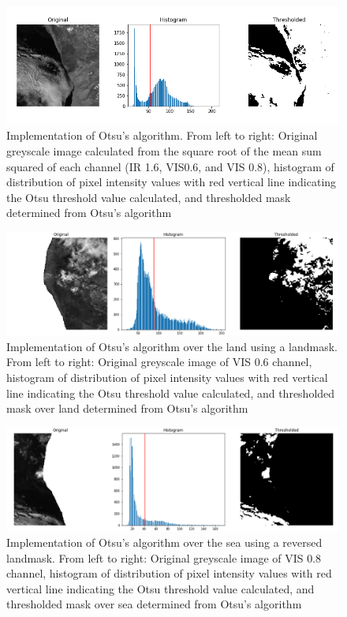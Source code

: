 \begin{figure}[hbt!]
    \centering
    \includegraphics[width=1\textwidth]{g_Otsu_sealand_fail.png}
    \caption{Implementation of Otsu's algorithm. From left to right: Original greyscale image calculated from the square root of the mean sum squared of each channel (IR 1.6, VIS0.6, and VIS 0.8), histogram of distribution of pixel intensity values with red vertical line indicating the Otsu threshold value calculated, and thresholded mask determined from Otsu's algorithm}
    \label{fig:g_Otsu_fail}
\end{figure}

\begin{figure}[hbt!]
    \centering
    \includegraphics[width=1\textwidth]{landmask_Otsu_threshold_2019-01-05 122743.png}
    \caption{Implementation of Otsu's algorithm over the land using a landmask. From left to right: Original greyscale image of VIS 0.6 channel, histogram of distribution of pixel intensity values with red vertical line indicating the Otsu threshold value calculated, and thresholded mask over land determined from Otsu's algorithm}
    \label{fig:bOtsu_land}
\end{figure}

\begin{figure}[hbt!]
    \centering
    \includegraphics[width=1\textwidth]{seamask_Otsu_threshold_2019-01-05 122743.png}
    \caption{Implementation of Otsu's algorithm over the sea using a reversed landmask. From left to right: Original greyscale image of VIS 0.8 channel, histogram of distribution of pixel intensity values with red vertical line indicating the Otsu threshold value calculated, and thresholded mask over sea determined from Otsu's algorithm}
    \label{fig:bOtsu_sea}
\end{figure}

